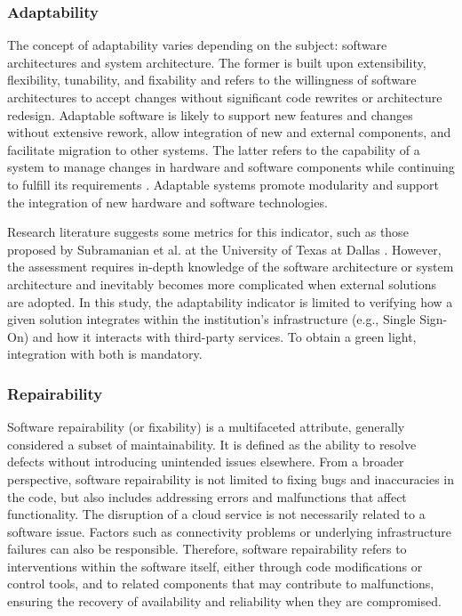 \subsubsection{Adaptability}
The concept of adaptability varies depending on the subject: software architectures and system architecture. The former is built upon extensibility, flexibility, tunability, and fixability \cite{fayad_aspects_1996} and refers to the willingness of software architectures to accept changes without significant code rewrites or architecture redesign. Adaptable software is likely to support new features and changes without extensive rework, allow integration of new and external components, and facilitate migration to other systems. The latter refers to the capability of a system to manage changes in hardware and software components while continuing to fulfill its requirements \cite{tanenbaum_distributed_2006}. Adaptable systems promote modularity and support the integration of new hardware and software technologies.

Research literature suggests some metrics for this indicator, such as those proposed by Subramanian et al. at the University of Texas at Dallas \cite{subramanian_metrics_2001}. However, the assessment requires in-depth knowledge of the software architecture or system architecture and inevitably becomes more complicated when external solutions are adopted. In this study, the adaptability indicator is limited to verifying how a given solution integrates within the institution's infrastructure (e.g., Single Sign-On) and how it interacts with third-party services. To obtain a green light, integration with both is mandatory.  

\subsubsection{Repairability}
Software repairability (or fixability) is a multifaceted attribute, generally considered a subset of maintainability. It is defined as the ability to resolve defects without introducing unintended issues elsewhere. From a broader perspective, software repairability is not limited to fixing bugs and inaccuracies in the code, but also includes addressing errors and malfunctions that affect functionality. The disruption of a cloud service is not necessarily related to a software issue. Factors such as connectivity problems or underlying infrastructure failures can also be responsible. Therefore, software repairability refers to interventions within the software itself, either through code modifications or control tools, and to related components that may contribute to malfunctions, ensuring the recovery of availability and reliability when they are compromised.


